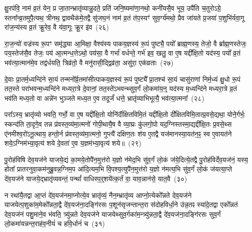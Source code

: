 क्षु॒रप॑वि॒ नाम॑ व्र॒तं येन॒ प्र जा॒तान्भ्रातृ॑व्यान्नु॒दते॒ प्रति॑ जनि॒ष्यमा॑णा॒नथो॒ कनी॑यसै॒व भूय॒ उपै॑ति च॒तुरो\-ऽग्रे॒ स्तना᳚न्व्र॒तमुपै॒त्यथ॒ त्रीनथ॒ द्वावथैक॑मे॒तद्वै सु॑जघ॒नं नाम॑ व्र॒तं त॑प॒स्यꣳ॑ सुव॒र्ग्य॑मथो॒ प्रैव जा॑यते प्र॒जया॑ प॒शुभि॑र्यवा॒गू रा॑ज॒न्य॑स्य व्र॒तं क्रू॒रेव॒ वै य॑वा॒गूः क्रू॒र इ॑व~(२६)

रा॒ज॒न्यो॑ वज्र॑स्य रू॒पꣳ समृ॑द्ध्या आ॒मिक्षा॒ वैश्य॑स्य पाकय॒ज्ञस्य॑ रू॒पं पुष्ट्यै॒ पयो᳚ ब्राह्म॒णस्य॒ तेजो॒ वै ब्रा᳚ह्म॒णस्तेजः॒ पय॒स्तेज॑सै॒व तेजः॒ पय॑ आ॒त्मन्ध॒त्ते\-ऽथो॒ पय॑सा॒ वै गर्भा॑ वर्धन्ते॒ गर्भ॑ इव॒ खलु॒ वा ए॒ष यद्दी᳚क्षि॒तो यद॑स्य॒ पयो᳚ व्र॒तं भव॑त्या॒त्मान॑मे॒व तद्व॑र्धयति॒ त्रिव्र॑तो॒ वै मनु॑रासी॒द्द्विव्र॑ता॒ असु॑रा॒ एक॑व्रताः~(२७)

दे॒वाः प्रा॒तर्म॒ध्यन्दि॑ने सा॒यं तन्मनो᳚र्व्र॒तमा॑सीत्पाकय॒ज्ञस्य॑ रू॒पं पुष्ट्यै᳚ प्रा॒तश्च॑ सा॒यं चासु॑राणां निर्म॒ध्यं क्षु॒धो रू॒पं तत॒स्ते परा॑भवन्म॒ध्यन्दि॑ने मध्यरा॒त्रे दे॒वानां॒ तत॒स्ते॑\-ऽभवन्थ्सुव॒र्गं लो॒कमा॑य॒न्॒ यद॑स्य म॒ध्यन्दि॑ने मध्यरा॒त्रे व्र॒तं भव॑ति मध्य॒तो वा अन्ने॑न भुञ्जते मध्य॒त ए॒व तदूर्जं॑ धत्ते॒ भ्रातृ॑व्याभिभूत्यै॒ भव॑त्या॒त्मना᳚~(२८)




परा᳚\-ऽस्य॒ भ्रातृ॑व्यो भवति॒ गर्भो॒ वा ए॒ष यद्दी᳚क्षि॒तो योनि॑र्दीक्षितविमि॒तं यद्दी᳚क्षि॒तो दी᳚क्षितविमि॒तात्प्र॒वसे॒द्यथा॒ योने॒र्गर्भः॒ स्कन्द॑ति ता॒दृगे॒व तन्न प्र॑वस्त॒व्य॑मा॒त्मनो॑ गोपी॒थायै॒ष वै व्या॒घ्रः कु॑लगो॒पो यद॒ग्निस्तस्मा॒द्यद्दी᳚क्षि॒तः प्र॒वसे॒थ्स ए॑नमीश्व॒रो॑\-ऽनू॒त्थाय॒ हन्तो॒र्न प्र॑वस्त॒व्य॑मा॒त्मनो॒ गुप्त्यै॑ दक्षिण॒तः श॑य ए॒तद्वै यज॑मानस्या॒यत॑न॒ꣴ॒ स्व ए॒वायत॑ने शये॒\-ऽग्निम॑भ्या॒वृत्य॑ शये दे॒वता॑ ए॒व य॒ज्ञम॑भ्या॒वृत्य॑ शये॥~(२९)

{\anuvakamend[{ए॒तद्वै क्रू॒र इ॒वैक॑व्रता आ॒त्मना॒ यज॑मानस्य॒ त्रयो॑दश च}]}%

पु॒रोह॑विषि देव॒यज॑ने याजये॒द्यं का॒मये॒तोपै॑न॒मुत्त॑रो य॒ज्ञो न॑मेद॒भि सु॑व॒र्गं लो॒कं ज॑ये॒दित्ये॒तद्वै पु॒रोह॑विर्देव॒यज॑नं॒ यस्य॒ होता᳚ प्रातरनुवा॒कम॑नुब्रु॒वन्न॒ग्निम॒प आ॑दि॒त्यम॒भि वि॒पश्य॒त्युपै॑न॒मुत्त॑रो य॒ज्ञो न॑मत्य॒भि सु॑व॒र्गं लो॒कं ज॑यत्या॒प्ते दे॑व॒यज॑ने याजये॒द्भ्रातृ॑व्यवन्तं॒ पन्थां᳚ वाधिस्प॒र्॒\mbox{}शये॑त्क॒र्तं वा॒ याव॒न्नान॑से॒ यात॒वै~(३०)

न रथा॑यै॒तद्वा आ॒प्तं दे॑व॒यज॑नमा॒प्नोत्ये॒व भ्रातृ॑व्यं॒ नैन॒म्भ्रातृ॑व्य आप्नो॒त्येको᳚न्नते देव॒यज॑ने याजयेत्प॒शुका॑म॒मेको᳚न्नता॒द्वै दे॑व॒यज॑ना॒दङ्गि॑रसः प॒शून॑सृजन्तान्त॒रा स॑दोहविर्धा॒ने उ॑न्न॒तꣴ स्या॑दे॒तद्वा एको᳚न्नतं देव॒यज॑नं पशु॒माने॒व भ॑वति॒ त्र्यु॑न्नते देव॒यज॑ने याजयेथ्सुव॒र्गका॑म॒न्त्र्यु॑न्नता॒द्वै दे॑व॒यज॑ना॒दङ्गि॑रसः सुव॒र्गं लो॒कमा॑यन्नन्त॒राह॑व॒नीयं॑ च हवि॒र्धानं॑ च~(३१)

